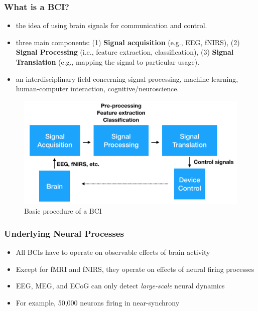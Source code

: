 \documentclass{beamer}
\begin{document}
\begin{frame}
\frametitle{What is a BCI?} 
\begin{itemize}
	\item the idea of using brain signals for communication and control.  
	\item three main components: (1) \textbf{Signal acquisition} (e.g., EEG, fNIRS), (2) \textbf{Signal Processing} (i.e., feature extraction, classification), (3) \textbf{Signal Translation} (e.g., mapping the signal to particular usage).   
	\item an interdisciplinary field concerning signal processing, machine learning, human-computer interaction, cognitive/neuroscience.  
\end{itemize}
\begin{figure}
	\includegraphics[width=0.5\linewidth]{image/bci}
	\caption{Basic procedure of a BCI}
\end{figure}
\end{frame}

\begin{frame}
\frametitle{Underlying Neural Processes}
\begin{itemize}
	\item All BCIs have to operate on observable effects of brain activity
	\item Except for fMRI and fNIRS, they operate on effects of neural firing processes
	\item EEG, MEG, and ECoG can only detect \textit{large-scale} neural dynamics
	\item For example, 50,000 neurons firing in near-synchrony
\end{itemize}
\end{frame}
\end{document}

